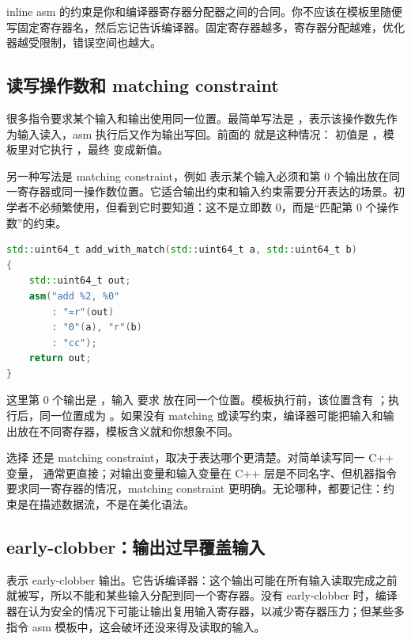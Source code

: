 \begin{deepdive}
inline asm 的约束是你和编译器寄存器分配器之间的合同。你不应该在模板里随便写固定寄存器名，然后忘记告诉编译器。固定寄存器越多，寄存器分配越难，优化器越受限制，错误空间也越大。
\end{deepdive}

\subsection{读写操作数和 matching constraint}

很多指令要求某个输入和输出使用同一位置。最简单写法是 ，表示该操作数先作为输入读入，asm 执行后又作为输出写回。前面的  就是这种情况： 初值是 ，模板里对它执行 ，最终  变成新值。

另一种写法是 matching constraint，例如  表示某个输入必须和第 0 个输出放在同一寄存器或同一操作数位置。它适合输出约束和输入约束需要分开表达的场景。初学者不必频繁使用，但看到它时要知道：这不是立即数 0，而是“匹配第 0 个操作数”的约束。

\begin{lstlisting}[language=C++]
std::uint64_t add_with_match(std::uint64_t a, std::uint64_t b)
{
    std::uint64_t out;
    asm("add %2, %0"
        : "=r"(out)
        : "0"(a), "r"(b)
        : "cc");
    return out;
}
\end{lstlisting}

这里第 0 个输出是 ，输入  要求  放在同一个位置。模板执行前，该位置含有 ；执行后，同一位置成为 。如果没有 matching 或读写约束，编译器可能把输入和输出放在不同寄存器，模板含义就和你想象不同。

选择  还是 matching constraint，取决于表达哪个更清楚。对简单读写同一 C++ 变量， 通常更直接；对输出变量和输入变量在 C++ 层是不同名字、但机器指令要求同一寄存器的情况，matching constraint 更明确。无论哪种，都要记住：约束是在描述数据流，不是在美化语法。

\subsection{early-clobber：输出过早覆盖输入}

 表示 early-clobber 输出。它告诉编译器：这个输出可能在所有输入读取完成之前就被写，所以不能和某些输入分配到同一个寄存器。没有 early-clobber 时，编译器在认为安全的情况下可能让输出复用输入寄存器，以减少寄存器压力；但某些多指令 asm 模板中，这会破坏还没来得及读取的输入。

